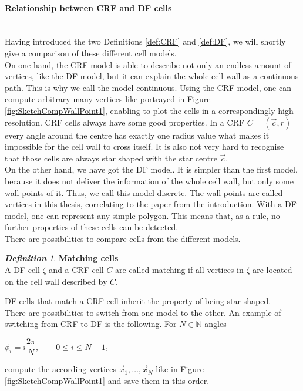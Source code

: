 \documentclass[a4paper,12pt,leqno]{article}
\theoremstyle{plain}
\theoremstyle{remark}
\newtheorem{definition}[theorem]{\bf Definition}
\begin{document}
\paragraph{Relationship between CRF and DF cells} \text{} \\
Having introduced the two Definitions \ref{def:CRF} and \ref{def:DF}, we will shortly give a comparison of these different cell models. \\ 
On one hand, the CRF model is able to describe not only an endless amount of vertices, like the DF model, but it can explain the whole cell wall as a continuous path. This is why we call the model continuous. Using the CRF model, one can compute arbitrary many vertices like portrayed in Figure \ref{fig:SketchCompWallPoint1}, enabling to plot the cells in a correspondingly high resolution. 
CRF cells always have some good properties. In a CRF $C = (\vec{c}, r)$ every angle around the centre has exactly one radius value what makes it impossible for the cell wall to cross itself. It is also not very hard to recognise that those cells are always star shaped with the star centre $\vec{c}$. \\
On the other hand, we have got the DF model. It is simpler than the first model, because it does not deliver the information of the whole cell wall, but only some wall points of it. Thus, we call this model discrete. The wall points are called vertices in this thesis, correlating to the paper \cite{Fletcher14} from the introduction. With a DF model, one can represent any simple polygon. This means that, as a rule, no further properties of these cells can be detected. \\ 
There are possibilities to compare cells from the different models.\\
\begin{definition} \textbf{Matching cells}\\
	A DF cell $\zeta$ and a CRF cell $C$ are called matching if all vertices in $\zeta$ are located on the cell wall described by $C$. \\
\end{definition}
DF cells that match a CRF cell inherit the property of being star shaped. \\
There are possibilities to switch from one model to the other. 
An example of switching from CRF to DF is the following. For $N \in \mathbb{N}$ angles 
\begin{center}
	$\phi_i = i \dfrac{2 \pi}{N}, \qquad 0 \leq i \leq N-1$, 
\end{center}
compute the according vertices $\vec{x}_1, \ldots, \vec{x}_N$ like in Figure \ref{fig:SketchCompWallPoint1} and save them in this order. \\
\end{document}
